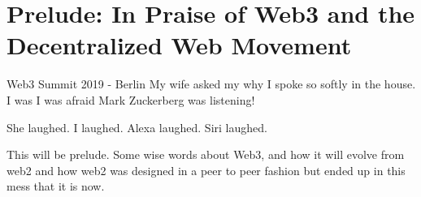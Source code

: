 \chapter*{Prelude: In Praise of Web3 and the Decentralized Web Movement}

\begin{chapquote}{Web3 Summit 2019 - Berlin}
	My wife asked my why I spoke so softly in the house. I was I was afraid Mark Zuckerberg was
	listening!

	She laughed.
	I laughed.
	Alexa laughed.
	Siri laughed.
\end{chapquote}

This will be prelude. Some wise words about Web3, and how it will evolve from web2 and how web2 was
designed in a peer to peer fashion but ended up in this mess that it is now.
